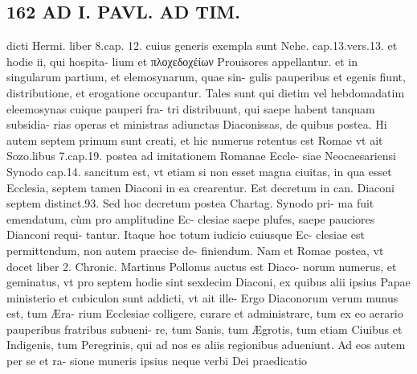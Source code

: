 \documentclass{article}
\begin{document}
\begin{pages}
\section*{162 AD I. PAVL. AD TIM. }\pstart dicti Hermi. liber  8.cap. 12. cuius generis exempla sunt Nehe. cap.13.vers.13. et hodie ii, qui hospita- lium et πλοχεδοχέίων Prouisores appellantur. et in singularum partium, et elemosynarum, quae sin- gulis pauperibus et egenis fiunt, distributione, et erogatione occupantur. Tales sunt qui dietim vel hebdomadatim eleemosynas cuique  pauperi fra- tri distribuunt, qui saepe habent tanquam subsidia- rias operas et ministras adiunctas Diaconissas, de quibus postea. Hi autem septem primum sunt creati, et hic numerus retentus est Romae vt ait Sozo.libus  7.cap.19. postea ad imitationem Romanae Eccle- siae Neocaesariensi Synodo cap.14. sancitum est, vt etiam si non esset magna ciuitas, in qua esset Ecclesia, septem tamen Diaconi in ea crearentur. Est decretum in can. Diaconi septem distinct.93. Sed hoc decretum postea Chartag. Synodo pri- ma fuit emendatum, cùm pro amplitudine Ec- clesiae saepe plufes, saepe pauciores Dianconi requi- tantur. Itaque hoc totum iudicio cuiusque Ec- clesiae est permittendum, non autem praecise de- finiendum. Nam et Romae postea, vt docet liber 2. Chronic. Martinus Pollonus auctus est Diaco- norum numerus, et geminatus, vt pro septem hodie sint sexdecim Diaconi, ex quibus alii ipsius Papae ministerio et cubiculon sunt addicti, vt ait ille- Ergo Diaconorum verum munus est, tum Æra- rium Ecclesiae colligere, curare et administrare, tum ex eo aerario pauperibus fratribus subueni- re, tum Sanis, tum Ægrotis, tum etiam Ciuibus et Indigenis, tum Peregrinis, qui ad nos es aliis regionibus adueniunt. Ad eos autem per se et ra- sione muneris ipsius neque verbi Dei praedicatio  \pend

\end{pages}
\end{document}
